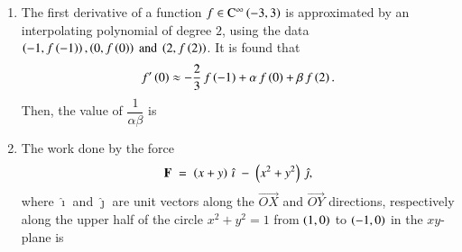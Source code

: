 \documentclass[journal,12pt,onecolumn]{IEEEtran}
\theoremstyle{remark}
\begin{document}
\begin{enumerate}
\hfill{}

\begin{enumerate}
\end{enumerate}

\item The first derivative of a function $f \in \mathrm{C}^{\infty}\left(-3,3\right)$ is approximated by an interpolating polynomial of degree $2$, using the data $\left(-1, f\left(-1\right)\right), \left(0, f\left(0\right)\right) \text{ and } \left(2, f\left(2\right)\right)$. It is found that
\begin{align*}
f'\left(0\right) \approx -\frac{2}{3}\,f\left(-1\right) + \alpha\,f\left(0\right) + \beta\,f\left(2\right).
\end{align*}
Then, the value of $\dfrac{1}{\alpha\beta}$ is

\hfill{}

\begin{enumerate}
\end{enumerate}

\item The work done by the force
\begin{align*}
\mathbf{F} \;=\; \left(x + y\right)\,\hat{\imath} \;-\; \left(x^{2} + y^{2}\right)\,\hat{\jmath},
\end{align*}
where $\hat{\imath}$ and $\hat{\jmath}$ are unit vectors along the $\overrightarrow{OX}$ and $\overrightarrow{OY}$ directions, respectively along the upper half of the circle $x^{2} + y^{2} = 1$ from $\left(1,0\right)$ to $\left(-1,0\right)$ in the $xy$-plane is

\hfill{}


\end{enumerate}
\end{document}
